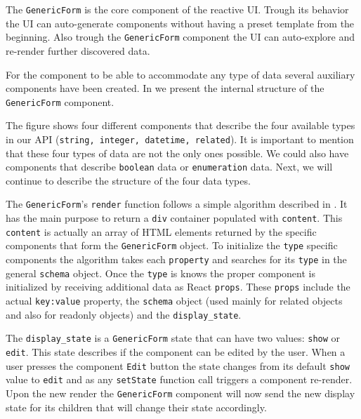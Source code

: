 The \texttt{GenericForm} is the core component of the reactive UI. Trough its behavior the UI can auto-generate components without having a preset template from the beginning. Also trough the \texttt{GenericForm} component the UI can auto-explore and re-render further discovered data. 

For the component to be able to accommodate any type of data several auxiliary components have been created. In  we present the internal structure of the \texttt{GenericForm} component.  


The figure shows four different components that describe the four available types in our API (\texttt{string, integer, datetime, related}). It is important to mention that these four types of data are not the only ones possible. We could also have components that describe \texttt{boolean} data or \texttt{enumeration} data. Next, we will continue to describe the structure of the four data types.

The \texttt{GenericForm}'s \texttt{render} function follows a simple algorithm described in . It has the main purpose to return a \texttt{div} container populated with \texttt{content}. This \texttt{content} is actually an array of HTML elements returned by the specific components that form the \texttt{GenericForm} object. To initialize the \texttt{type} specific components the algorithm takes each \texttt{property} and searches for its \texttt{type} in the general \texttt{schema} object. Once the \texttt{type} is knows the proper component is initialized by receiving additional data as React \texttt{props}. These \texttt{props} include the actual \texttt{key:value} property, the \texttt{schema} object (used mainly for related objects and also for readonly objects) and the \texttt{display\_state}.

The \texttt{display\_state} is a \texttt{GenericForm} state that can have two values: \texttt{show} or \texttt{edit}. This state describes if the component can be edited by the user. When a user presses the component \texttt{Edit} button the state changes from its default \texttt{show} value to \texttt{edit} and as any \texttt{setState} function call triggers a component re-render. Upon the new render the \texttt{GenericForm} component will now send the new display state for its children that will change their state accordingly.

